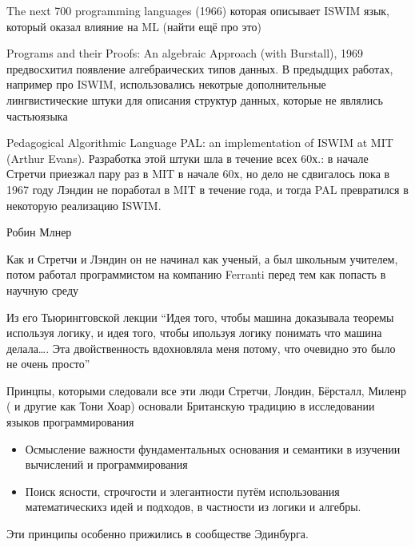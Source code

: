\documentclass[14pt]{matmex-diploma-custom}
\begin{document}
The next 700 programming languages (1966) которая описывает ISWIM язык, который оказал влияние на ML (найти ещё про это)

Programs and their Proofs: An algebraic Approach (with Burstall), 1969 предвосхитил появление алгебраических типов данных. В предыдщих работах, например про ISWIM, использовались некотрые дополнительные лингвистические  штуки для описания структур данных, которые не являлись частьюязыка 

Pedagogical Algorithmic Language 
PAL: an implementation of ISWIM at MIT (Arthur Evans). Разработка этой штуки шла  в течение всех 60х.: в начале Стретчи приезжал пару раз в MIT в начале 60х, но дело не сдвигалось пока в 1967 году Лэндин не поработал в MIT в течение года, и тогда PAL превратился в некоторую реализацию ISWIM. 

Робин Млнер

Как и Стретчи и Лэндин он не начинал как ученый, а был школьным учителем, потом работал программистом на компанию Ferranti перед тем как попасть в научную среду 
\begin{framed}
Из его Тьюрингговской лекции
“Идея того, чтобы машина доказывала теоремы используя логику, и идея того, чтобы ипользуя логику понимать что машина делала…. Эта двойственность  вдохновляла меня потому, что очевидно это было не очень просто”
\end{framed}
Принцпы, которыми следовали все эти люди
Стретчи, Лондин, Бёрсталл, Миленр ( и другие как Тони Хоар) основали Британскую традицию  в исследовании языков программирования

\begin{itemize}
 \item Осмысление важности фундаментальных основания и семантики в изучении вычислений и программирования
 \item Поиск ясности, строчгости и элегантности путём использования математическихз идей и подходов, в частности из логики и алгебры.
\end{itemize}

Эти принципы особенно прижились в сообществе Эдинбурга.
 
\end{document}
